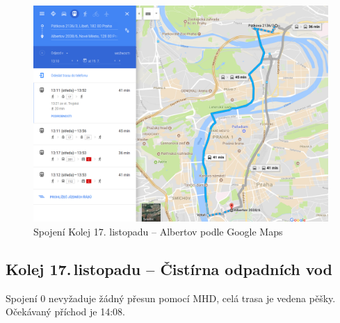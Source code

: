 \begin{figure}[h]
  \centering
    \includegraphics[width=\textwidth]{../img/kolej-albertov-google.png}
  \caption{Spojení Kolej 17. listopadu -- Albertov podle Google Maps}
  \label{fig:kolej-albertov-google}
\end{figure}

\clearpage
\subsection{Kolej 17.\,listopadu -- Čistírna odpadních vod}

Spojení 0 nevyžaduje žádný přesun pomocí MHD, celá trasa je vedena pěšky.
Očekávaný příchod je 14:08.


